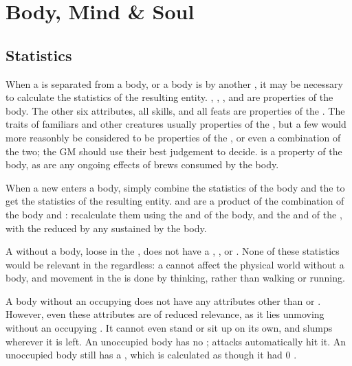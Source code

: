 \chapter{Body, Mind \& Soul}

\section{Statistics}

When a {\mind} is separated from a body, or a body is {\possessed} by another {\mind}, it may be necessary to calculate the statistics of the resulting entity.
, , , and  are properties of the body.
The other six attributes, all skills, and all feats are properties of the {\mind}.
The traits of familiars and other creatures usually properties of the {\body}, but a few would more reasonbly be considered to be properties of the {\mind}, or even a combination of the two; the GM should use their best judgement to decide.
\capital{\damage} is a property of the body, as are any ongoing effects of brews consumed by the body.

When a new {\mind} enters a body, simply combine the statistics of the body and the {\mind} to get the statistics of the resulting entity.
 and  are a product of the combination of the body and {\mind}: recalculate them using the  and  of the body, and the  and  of the {\mind}, with the  reduced by any {\damage} sustained by the body.

A {\mind} without a body, loose in the {\mentalrealm}, does not have a , , or .
None of these statistics would be relevant in the {\mentalrealm} regardless: a {\mind} cannot affect the physical world without a body, and movement in the {\mentalrealm} is done by thinking, rather than walking or running.

A body without an occupying {\mind} does not have any attributes other than  or .
However, even these attributes are of reduced relevance, as it lies unmoving without an occupying {\mind}.
It cannot even stand or sit up on its own, and slumps wherever it is left.
An unoccupied body has no ; attacks automatically hit it.
An unoccupied body still has a , which is calculated as though it had 0 .
